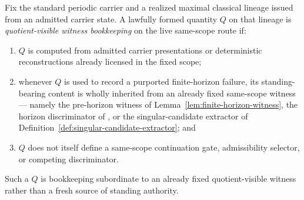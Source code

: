 \begin{manualdefinition}
\label{def:quotient-visible-witness-bookkeeping}
Fix the standard periodic carrier and a realized maximal classical lineage issued from an admitted carrier state. A lawfully formed quantity $Q$ on that lineage is \emph{quotient-visible witness bookkeeping} on the live same-scope route if:
\begin{enumerate}[label=(\roman*), leftmargin=2.2em]
\item $Q$ is computed from admitted carrier presentations or deterministic reconstructions already licensed in the fixed scope;
\item whenever $Q$ is used to record a purported finite-horizon failure, its standing-bearing content is wholly inherited from an already fixed same-scope witness --- namely the pre-horizon witness of Lemma~\ref{lem:finite-horizon-witness}, the horizon discriminator of \HorizonDetectabilityRef{}, or the singular-candidate extractor of Definition~\ref{def:singular-candidate-extractor}; and
\item $Q$ does not itself define a same-scope continuation gate, admissibility selector, or competing discriminator.
\end{enumerate}
Such a $Q$ is bookkeeping subordinate to an already fixed quotient-visible witness rather than a fresh source of standing authority.
\end{manualdefinition}

